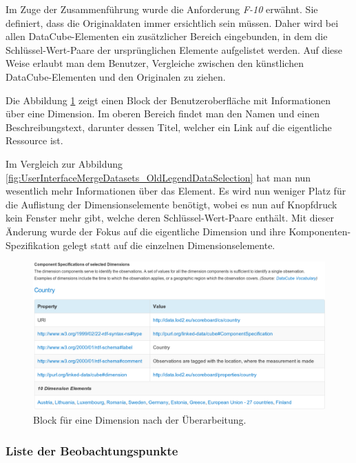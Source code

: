 \documentclass[11pt]{article}
\newcommand{\com}[1]{\marginpar{\em {\small{#1}}}} %
\begin{document}
Im Zuge der Zusammenführung wurde die Anforderung \textit{F-10}\com{Anforderung \\ F-10, S. \pageref{req:F10}} erwähnt. Sie definiert, dass die Originaldaten immer ersichtlich sein müssen. Daher wird bei allen DataCube-Elementen ein zusätzlicher Bereich eingebunden, in dem die Schlüssel-Wert-Paare der ursprünglichen Elemente aufgelistet werden. \com{Commit \\ 2d63df} Auf diese Weise erlaubt man dem Benutzer, Vergleiche zwischen den künstlichen DataCube-Elementen und den Originalen zu ziehen. 

Die Abbildung \ref{fig:UserInterfaceMergeDatasets_ScreenshotExampleDim_new} zeigt einen Block der Benutzeroberfläche mit Informationen über eine Dimension. Im oberen Bereich findet man den Namen und einen Beschreibungstext, darunter dessen Titel, welcher ein Link auf die eigentliche Ressource ist. 

Im Vergleich zur Abbildung \ref{fig:UserInterfaceMergeDatasets_OldLegendDataSelection} hat man nun wesentlich mehr Informationen über das Element. Es wird nun weniger Platz für die Auflistung der Dimensionselemente benötigt, wobei es nun auf Knopfdruck kein Fenster mehr gibt, welche deren Schlüssel-Wert-Paare enthält. Mit dieser Änderung wurde der Fokus auf die eigentliche Dimension und ihre Komponenten-Spezifikation gelegt statt auf die einzelnen Dimensionselemente.


%
%
\begin{figure}[h!]
    \centering
    \includegraphics[width=15cm]{RefreshedUserInterfaces/ScreenshotExampleDim_new.pdf}
    \caption{Block für eine Dimension nach der Überarbeitung.}
    \label{fig:UserInterfaceMergeDatasets_ScreenshotExampleDim_new}
\end{figure}

%
%
\subsubsection{Liste der Beobachtungspunkte}
\end{document}
